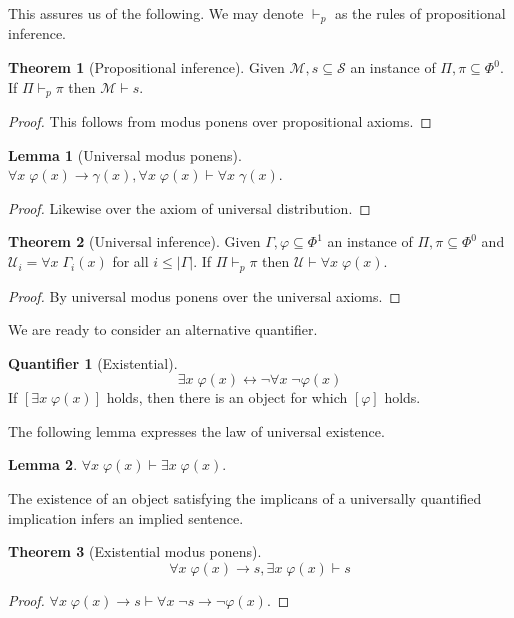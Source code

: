 \documentclass{amsbook}
\newcommand{\infers}{\mathrel\vdash}
\newcommand{\univ}[1]{\mathord\forall#1\;}
\newcommand{\exis}[1]{\mathord\exists#1\;}
\newcommand{\then}{\mathrel\rightarrow}
\newcommand{\eqv}{\mathrel\leftrightarrow}
\theoremstyle{definition}
\newtheorem{quant}{Quantifier}[chapter]
\newtheorem{thm}{Theorem}[section]
\newtheorem{lmm}{Lemma}[section]
\begin{document}
This assures us of the following. We may denote $\infers_p$ as the rules of propositional inference.

\begin{thm}[Propositional inference]
    Given $\mathcal M, s \subseteq \mathcal S$ an instance of $\Pi, \pi \subseteq \Phi^0$. If $\Pi \infers_p \pi$ then $\mathcal M \infers s$.
    \begin{proof}
        This follows from modus ponens over propositional axioms.
    \end{proof}
\end{thm}

\begin{lmm}[Universal modus ponens]
    $\univ x \varphi(x) \then \gamma(x), \univ x \varphi(x) \infers \univ x \gamma(x)$.
    \begin{proof}
        Likewise over the axiom of universal distribution.
    \end{proof}
\end{lmm}

\begin{thm}[Universal inference]
    Given $\varGamma, \varphi \subseteq \Phi^1$ an instance of $\Pi, \pi \subseteq \Phi^0$ and $\mathcal U_i = \univ x \varGamma_i(x)$ for all $i \leq |\varGamma|$. If $\Pi \infers_p \pi$ then $\mathcal U \infers \univ x \varphi(x)$.
    \begin{proof}
        By universal modus ponens over the universal axioms.
    \end{proof}
\end{thm}

We are ready to consider an alternative quantifier.

\begin{quant}[Existential]
    $$\exis x \varphi(x) \eqv \neg\univ x \neg\varphi(x)$$
    If $\left[ \exis x \varphi(x) \right]$ holds, then there is an object for which $[\varphi]$ holds.
\end{quant}

The following lemma expresses the law of universal existence.

\begin{lmm}
    $\univ x \varphi(x) \infers \exis x \varphi(x)$.
\end{lmm}

The existence of an object satisfying the implicans of a universally quantified implication infers an implied sentence.

\begin{thm}[Existential modus ponens]
    $$\univ x \varphi(x) \then s, \exis x \varphi(x) \infers s$$
    \begin{proof}
        $\univ x \varphi(x) \then s \infers \univ x \neg s \then \neg\varphi(x)$.
    \end{proof}
\end{thm}
\end{document}
